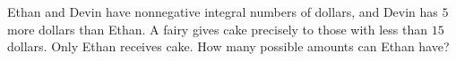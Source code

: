 Ethan and Devin have nonnegative integral numbers of dollars, and Devin has $5$ more dollars than Ethan. A fairy gives cake precisely to those with less than $15$ dollars. Only Ethan receives cake. How many possible amounts can Ethan have?
